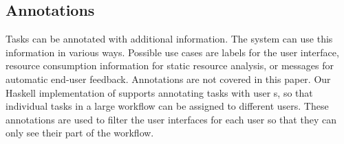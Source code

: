 \subsection{Annotations}

Tasks can be annotated with additional information.
The system can use this information in various ways.
Possible use cases are labels for the user interface, resource consumption information for static resource analysis, or messages for automatic end-user feedback.
Annotations are not covered in this paper.
Our Haskell implementation of \TOPHAT supports annotating tasks with user \ID{}s, so that individual tasks in a large workflow can be assigned to different users.
These annotations are used to filter the user interfaces for each user so that they can only see their part of the workflow.


%
%
%
%
